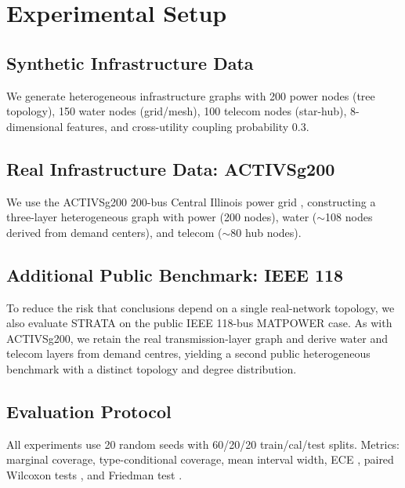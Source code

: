 \documentclass[twoside,11pt]{article}
\begin{document}
\section{Experimental Setup}
\label{sec:experiments}

\subsection{Synthetic Infrastructure Data}

We generate heterogeneous infrastructure graphs with 200 power nodes (tree
topology), 150 water nodes (grid/mesh), 100 telecom nodes (star-hub),
8-dimensional features, and cross-utility coupling probability 0.3.

\subsection{Real Infrastructure Data: ACTIVSg200}

We use the ACTIVSg200 200-bus Central Illinois power grid
\citep{birchfield2017grid}, constructing a three-layer heterogeneous
graph with power (200 nodes), water ($\sim$108 nodes derived from demand
centers), and telecom ($\sim$80 hub nodes).

\subsection{Additional Public Benchmark: IEEE 118}

To reduce the risk that conclusions depend on a single real-network topology, we
also evaluate STRATA on the public IEEE 118-bus MATPOWER case. As with
ACTIVSg200, we retain the real transmission-layer graph and derive water and
telecom layers from demand centres, yielding a second public heterogeneous
benchmark with a distinct topology and degree distribution.

\subsection{Evaluation Protocol}

All experiments use 20 random seeds with 60/20/20 train/cal/test splits.
Metrics: marginal coverage, type-conditional coverage, mean interval width,
ECE \citep{guo2017calibration}, paired Wilcoxon tests
\citep{wilcoxon1945individual}, and Friedman test \citep{friedman1937use}.

\end{document}
